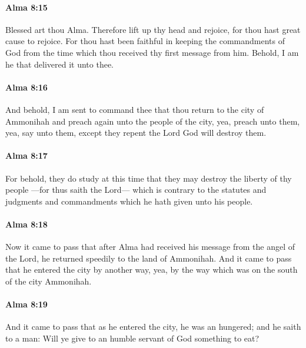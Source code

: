 		\paragraph{Alma 8:15} %
			\label{ALMA-8-15}

			Blessed art thou Alma.
			Therefore lift up thy head and rejoice,
			for thou hast great cause to rejoice.
			For thou hast been faithful in keeping the commandments of God
			from the time which thou received thy first message from him.
			Behold, I am he that delivered it unto thee.

		\paragraph{Alma 8:16} %
			\label{ALMA-8-16}

			And behold, I am sent to command thee
			that thou return to the city of Ammonihah
			and preach again unto the people of the city,
			yea, preach unto them,
			yea, say unto them,
			except they repent the Lord God will destroy them.

		\paragraph{Alma 8:17} %
			\label{ALMA-8-17}

			For behold, they do study at this time
			that they may destroy the liberty of thy people
			---for thus saith the Lord---
			which is contrary to the statutes and judgments and commandments
			which he hath given unto his people.

		\paragraph{Alma 8:18} %
			\label{ALMA-8-18}

			Now it came to pass that
			after Alma had received his message from the angel of the Lord,
			he returned speedily to the land of Ammonihah.
			And it came to pass that he entered the city by another way,
			yea, by the way which was on the south of the city Ammonihah.

		\paragraph{Alma 8:19} %
			\label{ALMA-8-19}

			And it came to pass that as he entered the city,
			he was an hungered;
			and he saith to a man:
			Will ye give to an humble servant of God something to eat?

